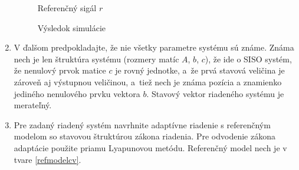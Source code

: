 \documentclass[a4paper, 10pt, ]{article}
\begin{document}
\begin{enumerate}[leftmargin=0pt, labelsep=4mm, itemsep=0pt]
    \begin{figure}[t]
    	\centering


    	\caption{Referenčný sigál $r$}
    	\label{Referenčný sigál $r$ 4cv}

    \end{figure}





    \begin{figure}[t]
    	\centering


    	\caption{Výsledok simulácie}
    	\label{Výsledok simulácie 4cv}

    \end{figure}










    \item V ďalšom predpokladajte, že nie všetky parametre systému sú známe. Známa nech je len štruktúra systému (rozmery matíc $A$, $b$, $c$), že ide o SISO systém, že nenulový prvok matice $c$ je rovný jednotke, a~že prvá stavová veličina je zároveň aj výstupnou veličinou, a~tiež nech je známa pozícia a znamienko jediného nenulového prvku vektora $b$. Stavový vektor riadeného systému je merateľný.




    \item Pre zadaný riadený systém navrhnite adaptívne riadenie s referenčným modelom so stavovou štruktúrou zákona riadenia. Pre odvodenie zákona adaptácie použite priamu Lyapunovou metódu. Referenčný model nech je v tvare \eqref{refmodelcv}.


\end{enumerate}
\end{document}
